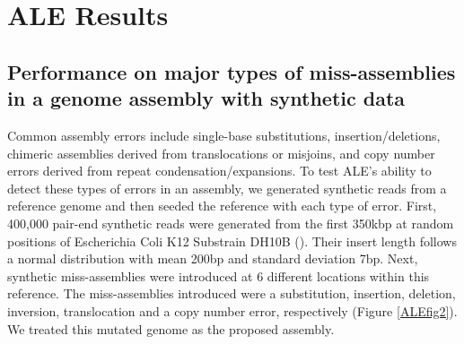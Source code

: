 \documentclass[phd,tocprelim]{cornell}
\begin{document}

\chapter{ALE Results} %
\label{cha:ALE Results}

\section{Performance on major types of miss-assemblies in a genome assembly with synthetic data}
Common assembly errors include single-base substitutions, insertion/deletions, chimeric assemblies derived from translocations or misjoins, and copy number errors derived from repeat condensation/expansions. To test ALE's ability to detect these types of errors in an assembly, we generated synthetic reads from a reference genome and then seeded the reference with each type of error. First, 400,000 pair-end synthetic reads were generated from the first 350kbp at random positions of Escherichia Coli K12 Substrain DH10B (\cite{Durfee2008}). Their insert length follows a normal distribution with mean 200bp and standard deviation 7bp. Next, synthetic miss-assemblies were introduced at 6 different locations within this reference.  The miss-assemblies introduced were a substitution, insertion, deletion, inversion, translocation and a copy number error, respectively (Figure \ref{ALEfig2}). We treated this mutated genome as the proposed assembly.
\end{document}
